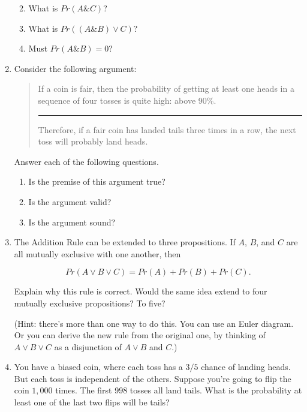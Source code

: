 \documentclass[justified]{tufte-book}
\providecommand{\tightlist}{%
  \setlength{\itemsep}{0pt}\setlength{\parskip}{0pt}}
\renewcommand{\wedge}{\mathbin{\&}}
\newcommand{\p}{Pr}
\newenvironment{argument}{\begin{quote}\normalsize}{\end{quote}}
\theoremstyle{definition}
\theoremstyle{definition}
\theoremstyle{definition}
\theoremstyle{remark}
\begin{document}
\begin{enumerate}
  \begin{enumerate}
  \def\labelenumii{\alph{enumii}.}
  \tightlist
  \item
    What is \(\p(A \wedge C)\)?
  \item
    What is \(\p((A \wedge B) \vee C)\)?
  \item
    Must \(\p(A \wedge B) = 0\)?
  \end{enumerate}
\item
  Consider the following argument:

  \begin{argument}
   If a coin is fair, then the probability of getting at least one heads in
   a sequence of four tosses is quite high: above 90\%.

   \begin{center}\rule{0.5\linewidth}{\linethickness}\end{center}

   Therefore, if a fair coin has landed tails three times in a row, the
   next toss will probably land heads.
   \end{argument}

  Answer each of the following questions.

  \begin{enumerate}
  \def\labelenumii{\alph{enumii}.}
  \tightlist
  \item
    Is the premise of this argument true?
  \item
    Is the argument valid?
  \item
    Is the argument sound?
  \end{enumerate}
\item
  The Addition Rule can be extended to three propositions. If \(A\),
  \(B\), and \(C\) are all mutually exclusive with one another, then

  \[ \p(A \vee B \vee C) = \p(A) + \p(B) + \p(C).\]

  Explain why this rule is correct. Would the same idea extend to four
  mutually exclusive propositions? To five?

  (Hint: there's more than one way to do this. You can use an Euler
  diagram. Or you can derive the new rule from the original one, by
  thinking of \(A \vee B \vee C\) as a disjunction of \(A \vee B\) and
  \(C\).)
\item
  You have a biased coin, where each toss has a \(3/5\) chance of
  landing heads. But each toss is independent of the others. Suppose
  you're going to flip the coin \(1,000\) times. The first 998 tosses
  all land tails. What is the probability at least one of the last two
  flips will be tails?
\end{enumerate}
\end{document}
